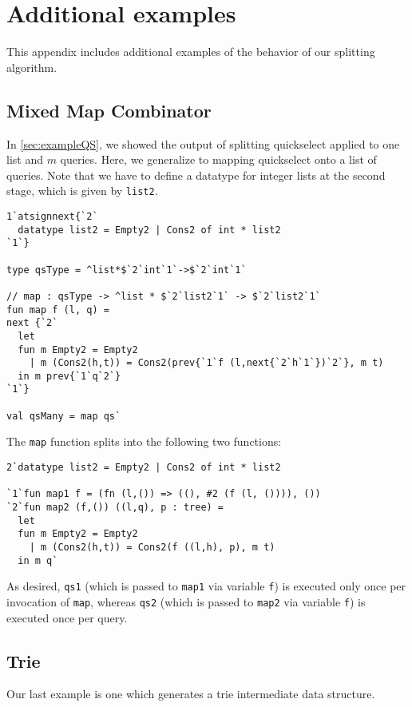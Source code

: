 \section{Additional examples}

This appendix includes additional examples of the behavior of our
splitting algorithm.

\subsection {Mixed Map Combinator}

In \ref{sec:exampleQS}, we showed the output of splitting quickselect
applied to one list and $m$ queries.  Here, we generalize to mapping
quickselect onto a list of queries. Note that we have to define a
datatype for integer lists at the second stage, which is given by
\texttt{list2}.
\begin{lstlisting} 
1`atsignnext{`2`
  datatype list2 = Empty2 | Cons2 of int * list2
`1`}

type qsType = ^list*$`2`int`1`->$`2`int`1`

// map : qsType -> ^list * $`2`list2`1` -> $`2`list2`1`
fun map f (l, q) = 
next {`2`
  let 
  fun m Empty2 = Empty2
    | m (Cons2(h,t)) = Cons2(prev{`1`f (l,next{`2`h`1`})`2`}, m t)
  in m prev{`1`q`2`}
`1`}

val qsMany = map qs`
\end{lstlisting}
The \texttt{map} function splits into the following two functions:
\begin{lstlisting} 
2`datatype list2 = Empty2 | Cons2 of int * list2

`1`fun map1 f = (fn (l,()) => ((), #2 (f (l, ()))), ())
`2`fun map2 (f,()) ((l,q), p : tree) =
  let 
  fun m Empty2 = Empty2
    | m (Cons2(h,t)) = Cons2(f ((l,h), p), m t) 
  in m q`
\end{lstlisting}

As desired, \texttt{qs1} (which is passed to \texttt{map1} via variable \texttt{f}) is executed only once per invocation of \texttt{map},
whereas \texttt{qs2} (which is passed to \texttt{map2} via variable \texttt{f}) is executed once per query.

\subsection{Trie}

Our last example is one which generates a trie intermediate data structure.

